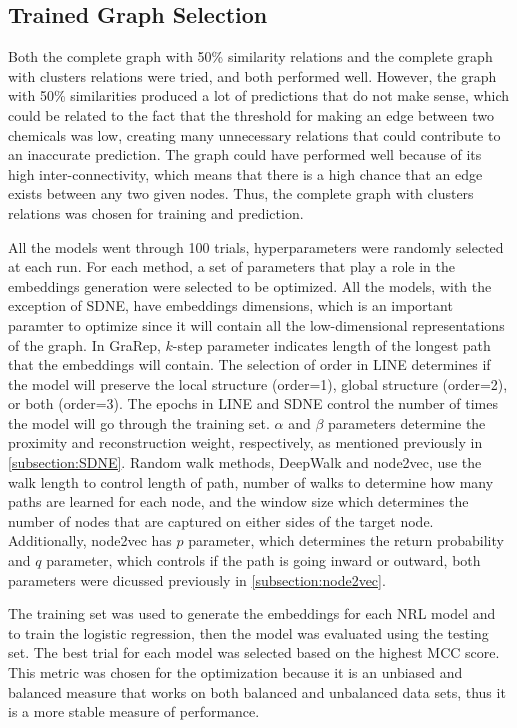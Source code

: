 \subsection{Trained Graph Selection}
Both the complete graph with 50\% similarity relations and the complete graph with clusters relations were tried, and both performed well. However, the graph with 50\% similarities produced a lot of predictions that do not make sense, which could be related to the fact that the threshold for making an edge between two chemicals was low, creating many unnecessary relations that could contribute to an inaccurate prediction. The graph could have performed well because of its high inter-connectivity, which means that there is a high chance that an edge exists between any two given nodes. Thus, the complete graph with clusters relations was chosen for training and prediction.

All the models went through 100 trials, hyperparameters were randomly selected at each run. For each method, a set of parameters that play a role in the embeddings generation were selected to be optimized. All the models, with the exception of SDNE, have embeddings dimensions, which is an important paramter to optimize since it will contain all the low-dimensional representations of the graph. In GraRep, $k$-step parameter indicates length of the longest path that the embeddings will contain. The selection of order in \ac{LINE} determines if the model will preserve the local structure (order=1), global structure (order=2), or both (order=3). The epochs in \ac{LINE} and \ac{SDNE} control the number of times the model will go through the training set. $\alpha$ and $\beta$ parameters determine the proximity and reconstruction weight, respectively, as mentioned previously in \ref{subsection:SDNE}. Random walk methods, DeepWalk and node2vec, use the walk length to control length of path, number of walks to determine how many paths are learned for each node, and the window size which determines the number of nodes that are captured on either sides of the target node. Additionally, node2vec has $p$ parameter, which determines the return probability and $q$ parameter, which controls if the path is going inward or outward, both parameters were dicussed previously in \ref{subsection:node2vec}.

The training set was used to generate the embeddings for each \ac{NRL} model and to train the logistic regression, then the model was evaluated using the testing set. The best trial for each model was selected based on the highest \ac{MCC} score. This metric was chosen for the optimization because it is an unbiased and balanced measure that works on both balanced and unbalanced data sets, thus it is a more stable measure of performance.

